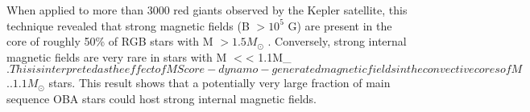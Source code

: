 When applied to more than 3000 red giants observed by the Kepler satellite, this technique revealed that
strong magnetic fields (B $> 10^5$ G) are present in the core of roughly 50\% of RGB stars with M $> 1.5M_\odot$ \citep{Stello_2016}.
Conversely, strong internal magnetic fields are very rare in stars with M $<$< 1.1M_\odot$. This is interpreted as the
effect of MS core-dynamo-generated magnetic fields in the convective cores of M $.$. 1.1M_\odot$ stars.
This result shows that a potentially very large fraction of main sequence OBA stars could host strong internal magnetic fields.



